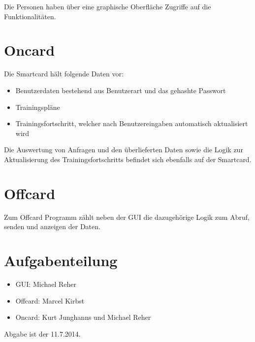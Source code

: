 \documentclass[a4paper,12pt]{article}
\begin{document}
Die Personen haben über eine graphische Oberfläche Zugriffe auf die Funktionalitäten.


\section{Oncard}
Die Smartcard hält folgende Daten vor:
\begin{itemize}
\item Benutzerdaten bestehend aus Benutzerart und das gehashte Passwort
\item Trainingspläne
\item Trainingsfortschritt, welcher nach Benutzereingaben automatisch aktualisiert wird
\end{itemize}

Die Auswertung von Anfragen und den überlieferten Daten sowie die Logik zur Aktualisierung des Trainingsfortschritts befindet sich ebenfalls auf der Smartcard.


\section{Offcard}
Zum Offcard Programm zählt neben der GUI die dazugehörige Logik zum Abruf, senden und anzeigen der Daten.\\



\section{Aufgabenteilung}

\begin{itemize}
\item{GUI:} Michael Reher
\item{Offcard:} Marcel Kirbst
\item{Oncard:} Kurt Junghanns und Michael Reher
\end{itemize}

Abgabe ist der 11.7.2014.



\end{document}
